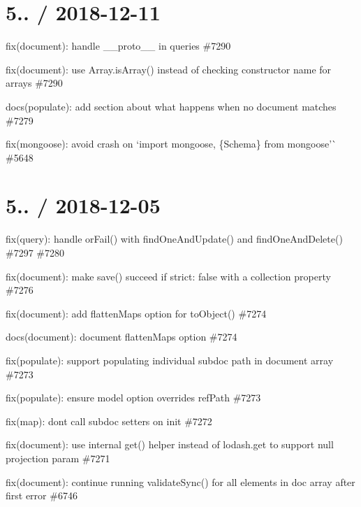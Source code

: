 \section*{5.. / 2018-\/12-\/11 }


\begin{DoxyItemize}
\item fix(document)\+: handle {\ttfamily \+\_\+\+\_\+proto\+\_\+\+\_\+} in queries \#7290
\item fix(document)\+: use Array.\+is\+Array() instead of checking constructor name for arrays \#7290
\item docs(populate)\+: add section about what happens when no document matches \#7279
\item fix(mongoose)\+: avoid crash on `import mongoose, \{Schema\} from \textquotesingle{}mongoose'\`{} \#5648
\end{DoxyItemize}

\section*{5.. / 2018-\/12-\/05 }


\begin{DoxyItemize}
\item fix(query)\+: handle {\ttfamily or\+Fail()} with {\ttfamily find\+One\+And\+Update()} and {\ttfamily find\+One\+And\+Delete()} \#7297 \#7280
\item fix(document)\+: make {\ttfamily save()} succeed if strict\+: false with a {\ttfamily collection} property \#7276
\item fix(document)\+: add {\ttfamily flatten\+Maps} option for to\+Object() \#7274
\item docs(document)\+: document flatten\+Maps option \#7274
\item fix(populate)\+: support populating individual subdoc path in document array \#7273
\item fix(populate)\+: ensure {\ttfamily model} option overrides {\ttfamily ref\+Path} \#7273
\item fix(map)\+: don\textquotesingle{}t call subdoc setters on init \#7272
\item fix(document)\+: use internal get() helper instead of lodash.\+get to support {\ttfamily null} projection param \#7271
\item fix(document)\+: continue running validate\+Sync() for all elements in doc array after first error \#6746
\end{DoxyItemize}

